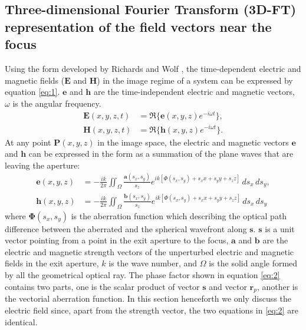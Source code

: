\documentclass[9pt,twocolumn,twoside]{osajnl}
\begin{document}
\subsection{Three-dimensional Fourier Transform (3D-FT) representation of the field vectors near the focus}
Using the form developed by Richards and Wolf \cite{richards1959electromagnetic}, the time-dependent electric and magnetic fields ($\mathbf{E}$ and $\mathbf{H}$) in the image regime of a system can be expressed by equation \eqref{eq:1}. $\mathbf{e}$ and $\mathbf{h}$ are the time-independent electric and magnetic vectors, $\omega$ is the angular frequency.
\begin{equation}\label{eq:1}
	\begin{aligned}
		\mathbf{E}(x, y, z, t)&=\Re\{\mathbf{e}(x, y, z)e^{-i\omega t}\},\\
		\mathbf{H}(x, y, z, t)&=\Re\{\mathbf{h}(x, y, z)e^{-i\omega t}\}.
	\end{aligned}	
\end{equation}
At any point $\textbf{P}(x,y,z)$ in the image space, the electric and magnetic vectors $\mathbf{e}$ and $\mathbf{h}$ can be expressed in the form as a summation of the plane waves that are leaving the aperture:
\begin{equation}
	\begin{aligned}\label{eq:2}
		\textbf{e}(x, y, z)&=-\frac{ik}{2\pi}\iint_\Omega\frac{\textbf{a}(s_x, s_y)}{s_z}e^{ik[\textbf{$\Phi$}(s_x, s_y)+s_xx+s_yy+s_zz]}\,ds_x\,ds_y,\\
		\textbf{h}(x, y, z)&=-\frac{ik}{2\pi}\iint_\Omega\frac{\textbf{b}(s_x, s_y)}{s_z}e^{ik[\textbf{$\Phi$}(s_x, s_y)+s_xx+s_yy+s_zz]}\,ds_x\,ds_y
	\end{aligned}
\end{equation}
where $\mathbf{\Phi}(s_x, s_y)$ is the aberration function which describing the optical path difference between the aberrated and the spherical wavefront along $\mathbf{s}$. $\mathbf{s}$ is a unit vector pointing from a point in the exit aperture to the focus, $\mathbf{a}$ and $\mathbf{b}$ are the electric and magnetic strength vectors of the unperturbed electric and magnetic fields in the exit aperture, $k$ is the wave number, and $\Omega$ is the solid angle formed by all the geometrical optical ray. The phase factor shown in equation \eqref{eq:2} contains two parts, one is the scalar product of vector $\mathbf{s}$ and vector $\mathbf{r}_p$, another is the vectorial aberration function. In this section henceforth we only discuss the electric field since, apart from the strength vector, the two equations in \eqref{eq:2} are identical. 
\end{document}
